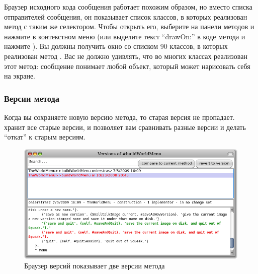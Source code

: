 \documentclass[a4paper,10pt,twoside]{book}
\begin{document}

Браузер исходного кода сообщения работает похожим образом, но вместо списка отправителей сообщения, он показывает список классов, в которых реализован метод с таким же селектором. Чтобы открыть его, выберите  на панели методов и нажмите  в контекстном меню (или выделите текст ``drawOn:'' в коде метода и нажмите ). Вы должны получить окно со списком 90 классов, в которых реализован метод . Вас не должно удивлять, что во многих классах реализован этот метод: сообщение  понимает любой объект, который может нарисовать себя на экране.

\subsubsection{Версии метода}


Когда вы сохраняете новую версию метода, то старая версия не пропадает.  \pharo хранит все старые версии, и позволяет вам сравнивать разные версии и делать ``откат'' к старым версиям.

\begin{figure}[btp]
   \centering
   \includegraphics[width=\textwidth]{Versions}
   \caption{Браузер версий показывает две версии метода }
\end{figure}
\end{document}
